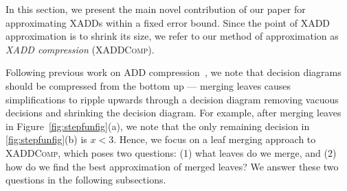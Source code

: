 \label{sec:approx}

In this section, we present the main novel contribution of our paper
for approximating XADDs within a fixed error bound.  Since the point
of XADD approximation is to shrink its size, we refer to our method of
approximation as \emph{XADD compression} (\textsc{XADDComp}).

Following previous work on ADD compression~\cite{apricodd}, we note
that decision diagrams should be compressed from the bottom up ---
merging leaves causes simplifications to ripple upwards through a
decision diagram removing vacuous decisions and shrinking the decision
diagram.  For example, after merging leaves in
Figure~\ref{fig:stepfunfig}(a), we note that the only remaining
decision in \ref{fig:stepfunfig}(b) is $x < 3$.  Hence, we focus on a
leaf merging approach to \textsc{XADDComp}, which poses two questions:
(1) what leaves do we merge, and (2) how do we find the best
approximation of merged leaves?  We answer these two questions in the
following subsections.




